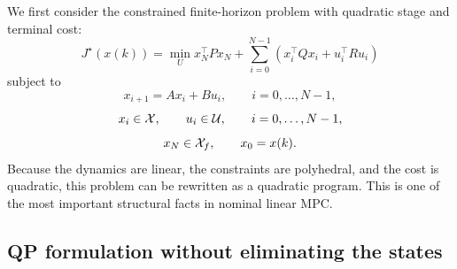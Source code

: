 We first consider the constrained finite-horizon problem with quadratic stage and terminal cost:
\[
J^\star(x(k))
=
\min_{U}
x_N^\top P x_N + \sum_{i=0}^{N-1}\left(x_i^\top Q x_i + u_i^\top R u_i\right)
\]
subject to
\[
x_{i+1}=Ax_i+Bu_i,\qquad i=0,\dots,N-1,
\]
\[
x_i\in\mathcal{X},\qquad u_i\in\mathcal{U},\qquad i=0,\dots,N-1,
\]
\[
x_N\in\mathcal{X}_f,
\qquad
x_0=x(k).
\]
Because the dynamics are linear, the constraints are polyhedral, and the cost is quadratic, this
problem can be rewritten as a quadratic program. This is one of the most important structural
facts in nominal linear MPC.

\subsection{QP formulation without eliminating the states}

